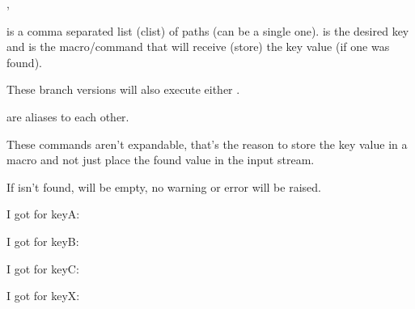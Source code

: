 \documentclass[10pt]{article}
\begin{document}
\begin{codedescribe}[code,update=2024/01/11]{\pgfkeysearchvalueofTF,\pgfkeysearchTF}
\begin{codesyntax}%
\end{codesyntax}
 is a comma separated list (clist) of paths (can be a single one).  is the desired key and  is the macro/command that will receive (store) the key value (if one was found).

These branch versions will also execute either .
  
\end{codedescribe}
\begin{tsremark}
\tsobj{\pgfkeysearchvalueofTF,\pgfkeysearchTF}  are aliases to each other.
\end{tsremark}
\begin{tsremark}
  These commands aren't expandable, that's the reason to store the key value in a macro and not just place the found value in the input stream.
\end{tsremark}
\begin{tsremark}
  If  isn't found,  will be empty, no warning or error will be raised.
\end{tsremark}


\begin{codestore}
\end{codestore}

\begin{codestore}
\end{codestore}


\begin{codestore}
 I got for keyA: \textbf{\VALkeyA} \par
 I got for keyB: \textbf{\VALkeyB} \par
 I got for keyC: \textbf{\VALkeyC} \par
 I got for keyX: \textbf{\VALkeyX} \par
\end{codestore}
\end{document}
